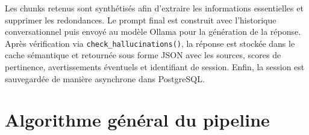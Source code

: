 Les chunks retenus sont synthétisés afin d’extraire les informations essentielles et supprimer les redondances. Le prompt final est construit avec l’historique conversationnel puis envoyé au modèle Ollama pour la génération de la réponse. Après vérification via \texttt{check\_hallucinations()}, la réponse est stockée dans le cache sémantique et retournée sous forme JSON avec les sources, scores de pertinence, avertissements éventuels et identifiant de session. Enfin, la session est sauvegardée de manière asynchrone dans PostgreSQL.%
\section{Algorithme général du pipeline}

